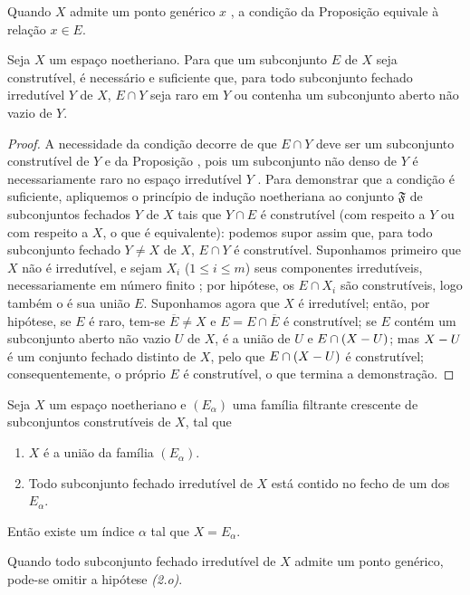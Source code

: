 Quando $X$ admite um ponto genérico $x$ , a condição da Proposição  equivale à relação $x\in E$.

\begin{proposition}[9.2.3]
\label{0.9.2.3}
Seja $X$ um espaço noetheriano.
Para que um subconjunto $E$ de $X$ seja construtível, é necessário e suficiente que, para todo subconjunto fechado irredutível $Y$ de $X$, $E\cap Y$ seja raro em $Y$ ou contenha um subconjunto aberto não vazio de $Y$.
\end{proposition}

\begin{proof}
A necessidade da condição decorre de que $E\cap Y$ deve ser um subconjunto construtível de $Y$ e da Proposição , pois um subconjunto não denso de $Y$ é necessariamente raro no espaço irredutível $Y$ .
Para demonstrar que a condição é suficiente, apliquemos o princípio de indução noetheriana  ao conjunto $\mathfrak{F}$ de subconjuntos fechados $Y$ de $X$ tais que $Y\cap E$ é construtível (com respeito a $Y$ ou com respeito a $X$, o que é equivalente): podemos supor assim que, para todo subconjunto fechado $Y\neq X$ de $X$, $E\cap Y$ é construtível.
Suponhamos primeiro que $X$ não é irredutível, e sejam $X_i$ ($1\leq i\leq m$) seus componentes irredutíveis, necessariamente em número finito ; por hipótese, os $E\cap X_i$ são construtíveis, logo também o é sua união $E$.
Suponhamos agora que $X$ é irredutível; então, por hipótese, se $E$ é raro, tem-se $\overline{E}\neq X$ e $E=E\cap\overline{E}$ é construtível; se $E$ contém um subconjunto aberto não vazio $U$ de $X$, é a união de $U$ e $E\cap(X- U)$; mas $X- U$ é um conjunto fechado distinto de $X$, pelo que $E\cap(X- U)$ é construtível; consequentemente, o próprio $E$ é construtível, o que termina a demonstração.
\end{proof}

\begin{corollary}[9.2.4]
\label{0.9.2.4}
Seja $X$ um espaço noetheriano e $(E_\alpha)$ uma família filtrante crescente de subconjuntos construtíveis de $X$, tal que
\begin{enumerate}
  \item[\emph{(1.o)}] $X$ é a união da família $(E_\alpha)$.
  \item[\emph{(2.o)}] Todo subconjunto fechado irredutível de $X$ está contido no fecho de um dos $E_\alpha$.
\end{enumerate}

Então existe um índice $\alpha$ tal que $X=E_\alpha$.

Quando todo subconjunto fechado irredutível de $X$ admite um ponto genérico, pode-se omitir a hipótese \emph{(2.o)}.
\end{corollary}

